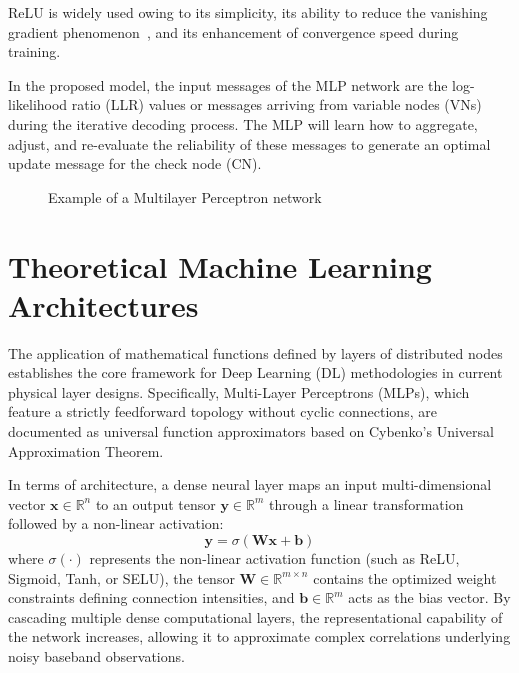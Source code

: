 \documentclass[a4paper,14pt]{extreport}
\begin{document}
ReLU is widely used owing to its simplicity, its ability to reduce the vanishing gradient phenomenon~\cite{ref11}, and its enhancement of convergence speed during training.

In the proposed model, the input messages of the MLP network are the log-likelihood ratio (LLR) values or messages arriving from variable nodes (VNs) during the iterative decoding process. The MLP will learn how to aggregate, adjust, and re-evaluate the reliability of these messages to generate an optimal update message for the check node (CN).

\begin{figure}[H]
    \centering
    \caption{Example of a Multilayer Perceptron network}
    \label{fig:mlp_example}
\end{figure}

\section{Theoretical Machine Learning Architectures}

The application of mathematical functions defined by layers of distributed nodes establishes the core framework for Deep Learning (DL) methodologies in current physical layer designs. Specifically, Multi-Layer Perceptrons (MLPs), which feature a strictly feedforward topology without cyclic connections, are documented as universal function approximators based on Cybenko's Universal Approximation Theorem. 

In terms of architecture, a dense neural layer maps an input multi-dimensional vector $\mathbf{x} \in \mathbb{R}^n$ to an output tensor $\mathbf{y} \in \mathbb{R}^m$ through a linear transformation followed by a non-linear activation:
\begin{equation}
    \mathbf{y} = \sigma\left( \mathbf{W}\mathbf{x} + \mathbf{b} \right)
\end{equation}
where $\sigma(\cdot)$ represents the non-linear activation function (such as ReLU, Sigmoid, Tanh, or SELU), the tensor $\mathbf{W} \in \mathbb{R}^{m \times n}$ contains the optimized weight constraints defining connection intensities, and $\mathbf{b} \in \mathbb{R}^m$ acts as the bias vector. By cascading multiple dense computational layers, the representational capability of the network increases, allowing it to approximate complex correlations underlying noisy baseband observations.
\end{document}
